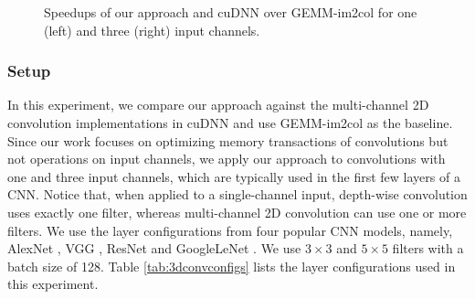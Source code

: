 \begin{figure}
\centering
	
\vspace{-2mm}
\caption{Speedups of our approach and cuDNN over GEMM-im2col for one (left) and three (right) input channels.} \label{fig:multi2druntime}
\vspace{-5mm}
\end{figure}


\subsubsection{Setup} In this experiment, we compare our approach against the multi-channel 2D convolution implementations in cuDNN and use GEMM-im2col as the baseline. Since our work focuses on optimizing memory transactions of convolutions but not operations on input channels, we apply our approach to convolutions with one and three input channels, which are typically used in the first few layers of a CNN. Notice that, when applied to a single-channel input, depth-wise convolution uses exactly one filter, whereas multi-channel 2D convolution can use one or more filters. We use the layer configurations from four popular CNN models,
namely, AlexNet \cite{Krizhevsky2012ImageNet}, VGG \cite{SimonyanZ14a}, ResNet \cite{HeZRS16} and GoogleLeNet \cite{SzegedyLJSRAEVR15}. We
use $3 \times 3$ and $5 \times 5$ filters with a batch size of 128. Table \ref{tab:3dconvconfigs} lists the layer configurations used in
this experiment.

